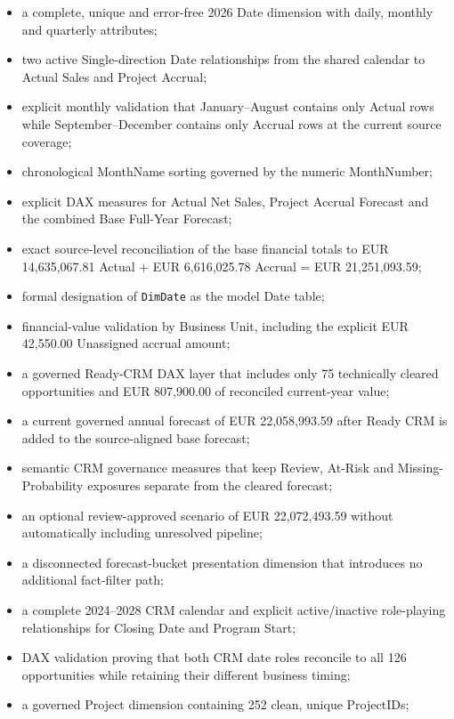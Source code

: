 \documentclass[11pt,a4paper]{article}
\begin{document}
\begin{itemize}[leftmargin=7mm,itemsep=3pt]
    313 Accrual and 126 CRM Opportunity records;
    \item a complete, unique and error-free 2026 Date dimension with daily,
    monthly and quarterly attributes;
    \item two active Single-direction Date relationships from the shared calendar
    to Actual Sales and Project Accrual;
    \item explicit monthly validation that January--August contains only Actual
    rows while September--December contains only Accrual rows at the current
    source coverage;
    \item chronological MonthName sorting governed by the numeric MonthNumber;
    \item explicit DAX measures for Actual Net Sales, Project Accrual Forecast and
    the combined Base Full-Year Forecast;
    \item exact source-level reconciliation of the base financial totals to
    EUR 14,635,067.81 Actual + EUR 6,616,025.78 Accrual =
    EUR 21,251,093.59;
    \item formal designation of \texttt{DimDate} as the model Date table;
    \item financial-value validation by Business Unit, including the explicit
    EUR 42,550.00 Unassigned accrual amount;
    \item a governed Ready-CRM DAX layer that includes only 75 technically cleared
    opportunities and EUR 807,900.00 of reconciled current-year value;
    \item a current governed annual forecast of EUR 22,058,993.59 after Ready CRM
    is added to the source-aligned base forecast;
    \item semantic CRM governance measures that keep Review, At-Risk and
    Missing-Probability exposures separate from the cleared forecast;
    \item an optional review-approved scenario of EUR 22,072,493.59 without
    automatically including unresolved pipeline;
    \item a disconnected forecast-bucket presentation dimension that introduces
    no additional fact-filter path;
    \item a complete 2024--2028 CRM calendar and explicit active/inactive
    role-playing relationships for Closing Date and Program Start;
    \item DAX validation proving that both CRM date roles reconcile to all
    126 opportunities while retaining their different business timing;
    \item a governed Project dimension containing 252 clean, unique ProjectIDs;

\end{itemize}
\end{document}
